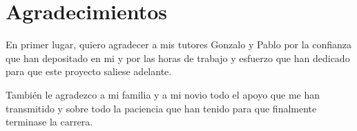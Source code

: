 
\chapter*{Agradecimientos}

En primer lugar, quiero agradecer a mis tutores Gonzalo y Pablo por la confianza que han depositado en mi y por las horas de trabajo y esfuerzo que han dedicado para que este proyecto saliese adelante. 

También le agradezco a mi familia y a mi novio todo el apoyo que me han transmitido y sobre todo la paciencia que han tenido para que finalmente terminase la carrera.










